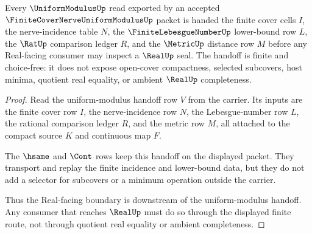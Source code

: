 \begin{theorem}
\label{thm:finite-cover-nerve-uniform-modulus-handoff}
Every $\UniformModulusUp$ read exported by an accepted $\FiniteCoverNerveUniformModulusUp$ packet is handed the finite cover cells $I$, the nerve-incidence table $N$, the $\FiniteLebesgueNumberUp$ lower-bound row $L$, the $\RatUp$ comparison ledger $R$, and the $\MetricUp$ distance row $M$ before any Real-facing consumer may inspect a $\RealUp$ seal. The handoff is finite and choice-free: it does not expose open-cover compactness, selected subcovers, host minima, quotient real equality, or ambient $\RealUp$ completeness.
\end{theorem}
\begin{proof}
Read the uniform-modulus handoff row $V$ from the carrier. Its inputs are the finite cover row $I$, the nerve-incidence row $N$, the Lebesgue-number row $L$, the rational comparison ledger $R$, and the metric row $M$, all attached to the compact source $K$ and continuous map $F$.

The $\hsame$ and $\Cont$ rows keep this handoff on the displayed packet. They transport and replay the finite incidence and lower-bound data, but they do not add a selector for subcovers or a minimum operation outside the carrier.

Thus the Real-facing boundary is downstream of the uniform-modulus handoff. Any consumer that reaches $\RealUp$ must do so through the displayed finite route, not through quotient real equality or ambient completeness.
\end{proof}


\begin{closurestatus}{\FiniteCoverNerveUniformModulusUp}
  \theoryclosure{\seedClosure}
  \formalstatus{\unformalizedV}
\end{closurestatus}
